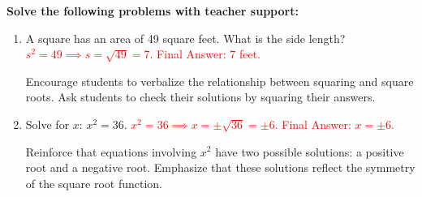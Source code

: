 \documentclass[12pt]{article}
\begin{document}
\begin{tcolorbox}[colframe=black!60, colback=white, 
coltitle=black, colbacktitle=black!15, fonttitle=\bfseries\Large, 
title=Guided Practice, halign title=center, left=10pt, right=10pt, top=10pt, bottom=15pt]
\textbf{Solve the following problems with teacher support:}

\begin{enumerate}[itemsep=5em]
    \item A square has an area of 49 square feet. What is the side length?  
    \textcolor{red}{\(s^2 = 49 \implies s = \sqrt{49} = 7.\) Final Answer: \(7\) feet.}
    
    {\color{blue} Encourage students to verbalize the relationship between squaring and square roots. Ask students to check their solutions by squaring their answers.}
    
    \item Solve for \(x\): \(x^2 = 36\).  
    \textcolor{red}{\(x^2 = 36 \implies x = \pm \sqrt{36} = \pm 6.\) Final Answer: \(x = \pm 6\).}
    
    {\color{blue} Reinforce that equations involving \(x^2\) have two possible solutions: a positive root and a negative root. Emphasize that these solutions reflect the symmetry of the square root function.}
\end{enumerate}
\end{tcolorbox}

\vspace{1em}
\end{document}
